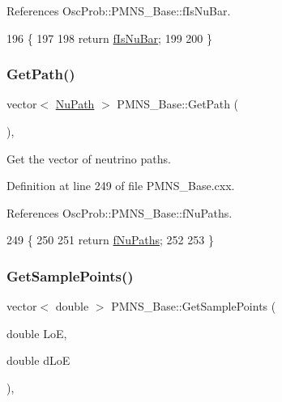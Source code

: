References Osc\+Prob\+::\+P\+M\+N\+S\+\_\+\+Base\+::f\+Is\+Nu\+Bar.


\begin{DoxyCode}
196                            \{
197 
198   \textcolor{keywordflow}{return} \hyperlink{classOscProb_1_1PMNS__Base_a0ebaeaefab36a3ff381c6293faedfdd6}{fIsNuBar};
199 
200 \}
\end{DoxyCode}
\mbox{\label{classOscProb_1_1PMNS__Base_ac8e196f2e85a2b1caaf705073ee95a5c}} 
\subsubsection{\texorpdfstring{Get\+Path()}{GetPath()}}
{\footnotesize\ttfamily vector$<$ \hyperlink{structOscProb_1_1NuPath}{Nu\+Path} $>$ P\+M\+N\+S\+\_\+\+Base\+::\+Get\+Path (\begin{DoxyParamCaption}{ }\end{DoxyParamCaption})\hspace{0.3cm}{\ttfamily [virtual]}, {\ttfamily [inherited]}}

Get the vector of neutrino paths. 

Definition at line 249 of file P\+M\+N\+S\+\_\+\+Base.\+cxx.



References Osc\+Prob\+::\+P\+M\+N\+S\+\_\+\+Base\+::f\+Nu\+Paths.


\begin{DoxyCode}
249                                  \{
250 
251   \textcolor{keywordflow}{return} \hyperlink{classOscProb_1_1PMNS__Base_a69db9d57e12fc7cbe0431bc6c18fac93}{fNuPaths};
252 
253 \}
\end{DoxyCode}
\mbox{\label{classOscProb_1_1PMNS__Base_a9eac8d768c1424755ee41f7e783af179}} 
\subsubsection{\texorpdfstring{Get\+Sample\+Points()}{GetSamplePoints()}}
{\footnotesize\ttfamily vector$<$ double $>$ P\+M\+N\+S\+\_\+\+Base\+::\+Get\+Sample\+Points (\begin{DoxyParamCaption}\item[{double}]{LoE,  }\item[{double}]{d\+LoE }\end{DoxyParamCaption})\hspace{0.3cm}{\ttfamily [virtual]}, {\ttfamily [inherited]}}

